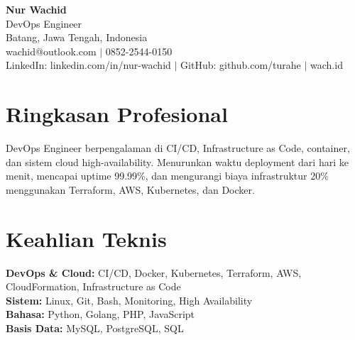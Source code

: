 \begin{center}
  {\LARGE\bfseries Nur Wachid}\\[3pt]
  DevOps Engineer\\[2pt]
  Batang, Jawa Tengah, Indonesia\\[2pt]
  wachid@outlook.com $|$ 0852-2544-0150\\[1pt]
  LinkedIn: linkedin.com/in/nur-wachid $|$ GitHub: github.com/turahe $|$ wach.id
\end{center}
\section*{Ringkasan Profesional}
DevOps Engineer berpengalaman di CI/CD, Infrastructure as Code, container, dan sistem cloud high-availability. Menurunkan waktu deployment dari hari ke menit, mencapai uptime 99.99\%, dan mengurangi biaya infrastruktur 20\% menggunakan Terraform, AWS, Kubernetes, dan Docker.
\section*{Keahlian Teknis}
\textbf{DevOps \& Cloud:} CI/CD, Docker, Kubernetes, Terraform, AWS, CloudFormation, Infrastructure as Code\\[1pt]
\textbf{Sistem:} Linux, Git, Bash, Monitoring, High Availability\\[1pt]
\textbf{Bahasa:} Python, Golang, PHP, JavaScript\\[1pt]
\textbf{Basis Data:} MySQL, PostgreSQL, SQL
